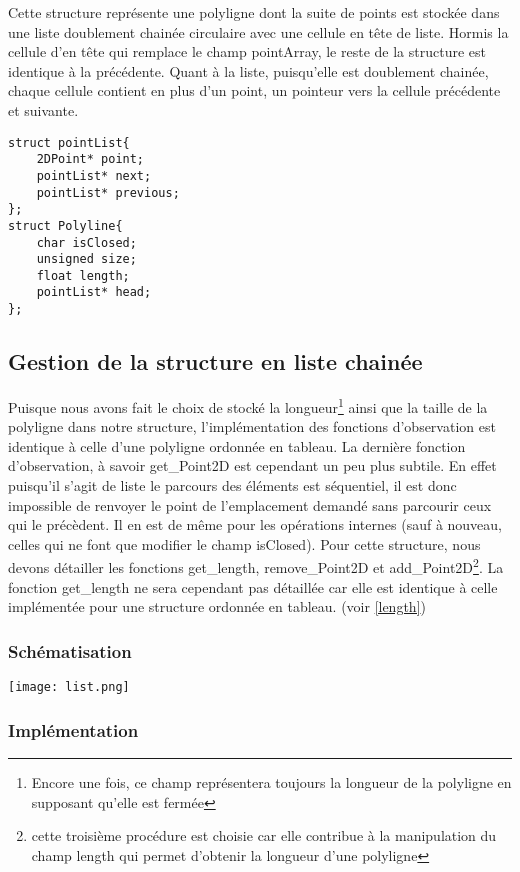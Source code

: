 \documentclass[a4paper, 11pt, oneside]{article}
\begin{document}
Cette structure représente une polyligne dont la suite de points est stockée dans une liste doublement chainée circulaire avec une cellule en tête de liste. Hormis la cellule d'en tête qui remplace le champ pointArray, le reste de la structure est identique à la précédente. Quant à la liste, puisqu'elle est doublement chainée, chaque cellule contient en plus d'un point, un pointeur vers la cellule précédente et suivante.

\begin{lstlisting}
struct pointList{
	2DPoint* point;
	pointList* next;
	pointList* previous;
};
struct Polyline{
	char isClosed;
	unsigned size;
	float length;
	pointList* head;
};
\end{lstlisting}

\subsection{Gestion de la structure en liste chainée}

Puisque nous avons fait le choix de stocké la longueur\footnote{Encore une fois, ce champ représentera toujours la longueur de la polyligne en supposant qu'elle est fermée} ainsi que la taille de la polyligne dans notre structure, l'implémentation des fonctions d'observation est identique à celle d'une polyligne ordonnée en tableau. La dernière fonction d'observation, à savoir get\_Point2D est cependant un peu plus subtile. En effet puisqu'il s'agit de liste le parcours des éléments est séquentiel, il est donc impossible de renvoyer le point de l'emplacement demandé sans parcourir  ceux qui le précèdent. Il en est de même pour les opérations internes (sauf à nouveau, celles qui ne font que modifier le champ isClosed). Pour cette structure, nous devons détailler les fonctions get\_length, remove\_Point2D et add\_Point2D\footnote{cette troisième procédure est choisie car elle contribue à la manipulation du champ length qui permet d'obtenir la longueur d'une polyligne}. La fonction get\_length ne sera cependant pas détaillée car elle est identique à celle implémentée pour une structure ordonnée en tableau. (voir \ref{length})

\subsubsection{Schématisation}

\texttt{[image: list.png]}

\subsubsection{Implémentation}
\end{document}
